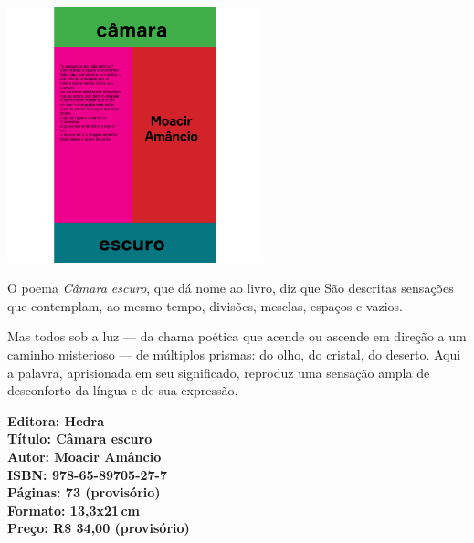 \begin{center}
\hspace*{-3.6cm}
\hspace*{3.1cm}\includegraphics[width=74mm]{./CAPAS/HEDRA_CAMARA.jpg}
\end{center}
\hspace*{-7cm}\hrulefill\hspace*{-7cm}
\medskip

\noindent{}O poema \textit{Câmara escuro}, que dá nome ao livro, diz que  São descritas sensações que contemplam, ao mesmo tempo, divisões, mesclas, espaços e vazios. 

Mas todos sob a luz --- da chama poética que acende ou ascende em direção a um caminho misterioso --- de múltiplos prismas: do olho, do cristal, do deserto. Aqui a palavra, aprisionada em seu significado, reproduz uma sensação ampla de desconforto da língua e de sua expressão.

\vfill
\noindent\begin{minipage}[c]{1\linewidth}
{\small\textbf{
\hspace*{-.1cm}Editora: Hedra\\
Título: Câmara escuro\\
Autor: Moacir Amâncio\\ 
ISBN: 978-65-89705-27-7\\
Páginas: 73 (provisório)\\
Formato: 13,3x21\,cm\\
Preço: R\$ 34,00 (provisório)\\
}}
\end{minipage}
\pagebreak

